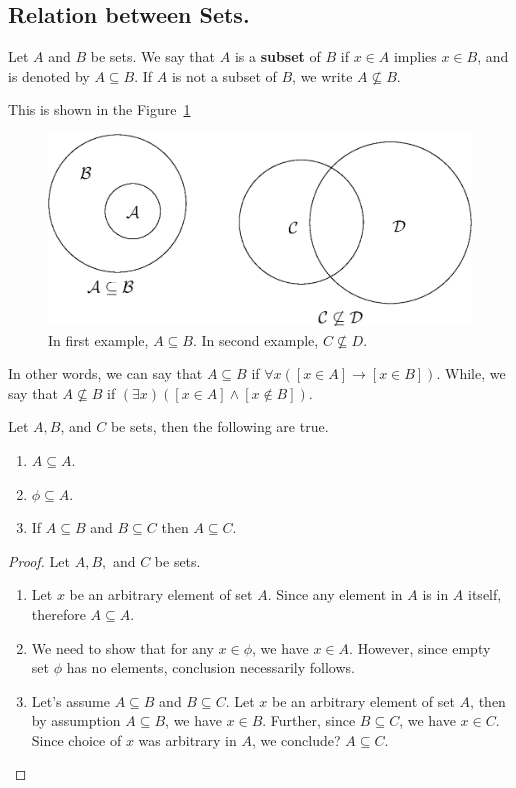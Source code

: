 \documentclass[a4paper,english,12pt]{article}
\begin{document}
\subsection{Relation between Sets.}

\begin{defn}[Subset] Let ${A}$ and ${B}$ be sets. We say that ${A}$ is a \textbf{subset} of ${B}$ if $x\in {A}$ implies $x\in {B}$, and is denoted by ${A}\subseteq {B}$. If $A$ is not a subset of $B$, we write $A \nsubseteq B$.
\end{defn}
This is shown in the Figure~\ref{Fig:Sets}
\begin{figure}[!h]
\label{Fig:Sets}
\centering
 \includegraphics[height=2.0in]{fig33.eps}
\caption{In first example, $A \subseteq B$. In second example, $C \nsubseteq D$.}
\end{figure}
In other words, we can say that ${A}\subseteq {B}$ if $\forall x ([x\in {A}] \rightarrow [x\in{B}])$. While, we say that ${A}\nsubseteq{B}$ if $(\exists x) ([x\in{A}]\wedge[x\not\in{B}])$.

\begin{lem} Let ${A},{B}$, and ${C}$ be sets, then the following are true.
\begin{enumerate}
 \item ${A}\subseteq {A}$.
 \item ${\phi}\subseteq{A}$.
 \item If ${A}\subseteq{B}$ and ${B}\subseteq{C}$ then ${A}\subseteq{C}$.
\end{enumerate}
\end{lem}

\begin{proof} Let ${A},{B},$ and ${C}$ be sets.
\begin{enumerate}
 \item %
Let $x$ be an arbitrary element of set ${A}$. Since any element in ${A}$ is in ${A}$ itself, therefore ${A}\subseteq {A}$.
 \item We need to show that for any $x \in \phi$, we have $x \in A$. However, since empty set $\phi$ has no elements, conclusion necessarily follows. %
 \item Let's assume ${A}\subseteq {B}$ and $B \subseteq C$. Let $x$ be an arbitrary element of set ${A}$, then by assumption $A \subseteq B$, we have $x \in {B}$. Further, since ${B}\subseteq{C}$, we have $x\in {C}$. Since choice of $x$ was arbitrary in $A$, we conclude? ${A}\subseteq{C}$.
\end{enumerate}
\end{proof}
\end{document}

